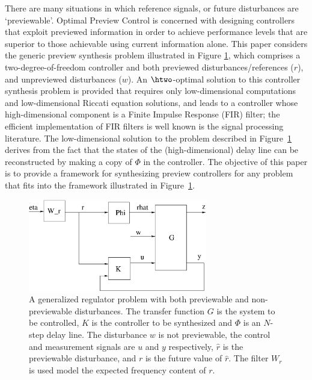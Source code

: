 \label{sec:Intro}
There are many situations in which reference signals, or future disturbances are `previewable'. 
Optimal Preview Control is concerned with designing controllers that exploit previewed information in order to achieve performance levels that are superior to those achievable using current information alone. This paper considers the generic preview synthesis problem illustrated in Figure \ref{fig:DistRejSys}, which comprises a two-degree-of-freedom controller and both previewed disturbances/references ($r$), and unpreviewed disturbances ($w$).
An $\htwo$-optimal solution to this controller synthesis problem is provided that requires only low-dimensional computations and low-dimensional Riccati equation solutions, and leads to a controller whose high-dimensional component is a Finite Impulse Response (FIR) filter; the efficient implementation of FIR filters is well known is the signal processing literature.
The low-dimensional solution to the problem described in Figure~\ref{fig:DistRejSys} derives from the fact that the states of the (high-dimensional) delay line can be reconstructed by making a copy of $\Phi$ in the controller.  The objective of this paper is to provide a framework for synthesizing preview controllers for any problem that fits into the framework illustrated in Figure~\ref{fig:DistRejSys}.
\begin{figure}
\begin{center}
\stdcontrolfrags
{}
\includegraphics[height=4.0cm]{./diags/DistRejSys.eps}
\caption{\label{fig:DistRejSys} A generalized regulator problem with both previewable and non-previewable disturbances. The transfer function $G$ is the system to be controlled, $K$ is the controller to be synthesized and $\Phi$ is an $N$-step delay line. The disturbance $w$ is not previewable, the control and measurement signals are $u$ and $y$ respectively, $\hat r$ is the previewable disturbance, and $r$ is the future value of $\hat r$. The filter $W_r$ is used  model the expected frequency content of $r$.}
\end{center}
\end{figure}

